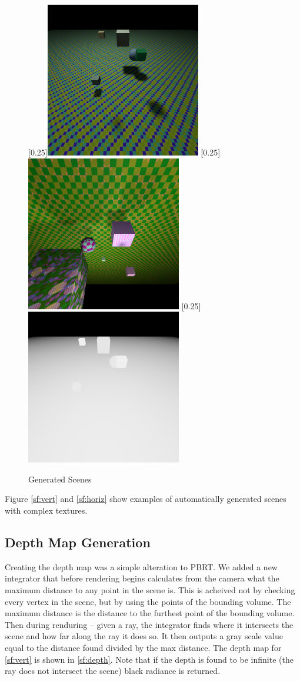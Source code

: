 \documentclass[acmsmall]{acmart}
\begin{document}
\begin{figure}
	\centering
		[0.25\textwidth]{\includegraphics[width=.25\textwidth]{images/gen1.png}}
	\hspace{.05\textwidth}
		[0.25\textwidth]{\includegraphics[width=.25\textwidth]{images/gen2.png}}
	\hspace{.05\textwidth}
		[0.25\textwidth]{\includegraphics[width=.25\textwidth]{images/gen1_depth.png}}
	\caption{Generated Scenes}	
	\label{f:exampleScenes}
\end{figure}

Figure \ref{sf:vert} and \ref{sf:horiz} show examples of automatically generated scenes with complex textures.

\subsection{Depth Map Generation}
\label{subsec:depthMap}

Creating the depth map was a simple alteration to PBRT. We added a new integrator that before rendering begins calculates from the camera what the maximum distance to any point in the scene is. This is acheived not by checking every vertex in the scene, but by using the points of the bounding volume. The maximum distance is the distance to the furthest point of the bounding volume. Then during renduring -- given a ray, the integrator finds where it intersects the scene and how far along the ray it does so. It then outputs a gray scale value equal to the distance found divided by the max distance. The depth map for \ref{sf:vert} is shown in \ref{sf:depth}. Note that if the depth is found to be infinite (the ray does not intersect the scene) black radiance is returned.
\end{document}
